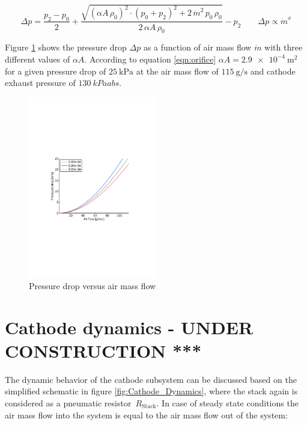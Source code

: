 \documentclass[11pt,a4paper,english,twoside]{scrreprt}
\begin{document}
\begin{equation}
  \label{eqn:orificedeltap}
  \Delta p = \frac{p_2-p_0}{2} + \frac{\sqrt{(\alpha A\, \rho_0)^2 \cdot (p_0+p_2)^2 + 2\, \dot m^2\, p_0\, \rho_0}}{2\, \alpha A\, \rho_0} - p_2 \qquad 
  \Delta p \propto \dot m^x
\end{equation}


Figure \ref{fig:pD_vs_mdot} shows the pressure drop $\Delta p$ as a function of air mass flow $\dot m$ with three different values of $\alpha A$. According to equation \ref{eqn:orifice} $\alpha A = \SI{2.9e-4}{\meter\squared}$ for a given pressure drop of $\SI{25}{\kPa}$ at the air mass flow of $\SI{115}{\gram\per\second}$ and cathode exhaust pressure of $\SI{130}{kPaabs}$. 

\begin{figure}
  \centering
  \includegraphics*[width=0.5\textwidth,angle=0]{FCF_Chart_PressureDrop.pdf}
  \caption[Pressure drop versus air mass flow]{Pressure drop versus air mass flow}
  \label{fig:pD_vs_mdot}
\end{figure}


\section{Cathode dynamics - UNDER CONSTRUCTION ***}

The dynamic behavior of the cathode subsystem can be discussed based on the simplified schematic in figure \ref{fig:Cathode_Dynamics}, where the stack again is considered as a pneumatic resistor~$R_\mathrm{Stack}$. In case of steady state conditions the air mass flow into the system is equal to the air mass flow out of the system:
\end{document}
